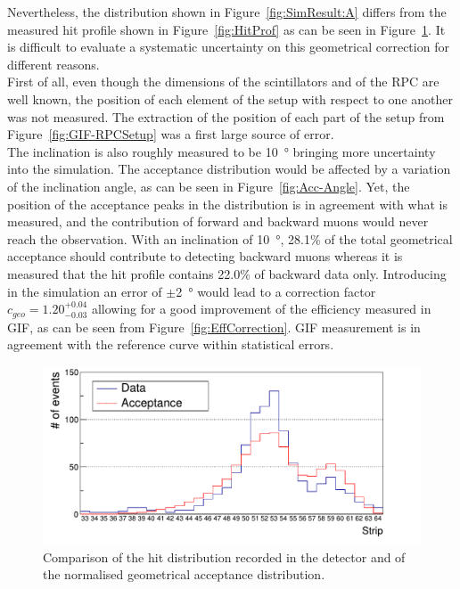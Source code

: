 	Nevertheless, the distribution shown in Figure~\ref{fig:SimResult:A} differs from the measured hit profile shown in Figure~\ref{fig:HitProf} as can be seen in Figure~\ref{fig:Data-Acc-Comp}. It is difficult to evaluate a systematic uncertainty on this geometrical correction for different reasons.\\
	First of all, even though the dimensions of the scintillators and of the RPC are well known, the position of each element of the setup with respect to one another was not measured. The extraction of the position of each part of the setup from Figure~\ref{fig:GIF-RPCSetup} was a first large source of error.\\
	The inclination is also roughly measured to be \SI{10}{\degree} bringing more uncertainty into the simulation. The acceptance distribution would be affected by a variation of the inclination angle, as can be seen in Figure~\ref{fig:Acc-Angle}. Yet, the position of the acceptance peaks in the distribution is in agreement with what is measured, and the contribution of forward and backward muons would never reach the observation. With an inclination of \SI{10}{\degree}, 28.1\% of the total geometrical acceptance should contribute to detecting backward muons whereas it is measured that the hit profile contains 22.0\% of backward data only. Introducing in the simulation an error of $\pm$\SI{2}{\degree} would lead to a correction factor $c_{geo} = 1.20^{+0.04}_{-0.03}$ allowing for a good improvement of the efficiency measured in GIF, as can be seen from Figure~\ref{fig:EffCorrection}. GIF measurement is in agreement with the reference curve within statistical errors.
	
\endgroup
\newpage

	\begin{figure}[H]
		\centering
		\includegraphics[width = .7\linewidth]{fig/chapt5/Data-Acc-Comp.pdf}
		\caption{\label{fig:Data-Acc-Comp} Comparison of the hit distribution recorded in the detector and of the normalised geometrical acceptance distribution.}
	\end{figure}

